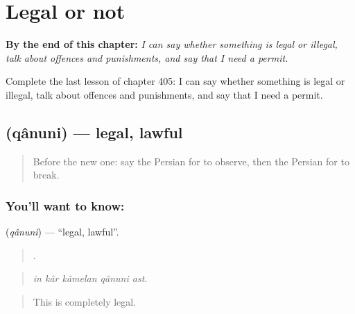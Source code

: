 
\chapter{Legal or not}
\label{ch:fa-legal-or-not}

\begin{chapteropening}
\textbf{By the end of this chapter:} \emph{I can say whether something is legal or illegal, talk about offences and punishments, and say that I need a permit.}

Complete the last lesson of chapter 405: I can say whether something is legal or illegal, talk about offences and punishments, and say that I need a permit.
\end{chapteropening}

\section[\texorpdfstring{\fa{قانونی} (qânuni)}{قانونی (qânuni)}]{ (qânuni) — legal, lawful}

\label{lesson:FA-C405-qanuni}



\begin{quote}
Before the new one: say the Persian for to observe, then the Persian for to break.
\end{quote}

\subsection*{You'll want to know: }
\textbf{} (\emph{qânuni}) — \textquotedblleft{}legal, lawful\textquotedblright{}.

\begin{quote}
    .
\end{quote}

\begin{quote}
\emph{in kâr kâmelan qânuni ast.}
\end{quote}

\begin{quote}
This is completely legal.
\end{quote}

